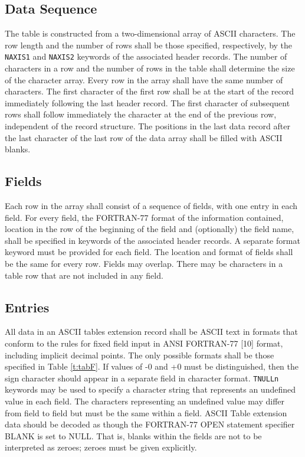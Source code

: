    \subsection{Data Sequence}
   The table is constructed from a two-dimensional array of 
   ASCII characters.
   The row length and the number of rows shall be those specified, 
   respectively, by the {\tt NAXIS1} 
   and {\tt NAXIS2} keywords
   of the associated header records.  The
   number of characters in a row and the number of rows in the
   table shall determine the size of the character array.  Every row
   in the array shall have the same number of characters.  The
   first character of the first row shall be at the start of the record
   immediately following the last header record.  The first
   character of subsequent rows shall follow immediately the
   character at the end of the previous row,
   independent of the record structure.  The positions in the last
   data record after the last character of the last row of the data
   array shall be filled with ASCII blanks.
  
   \subsection{Fields}
   Each row in the array shall consist of a sequence of fields,
   with one entry in each field.  For every field, the FORTRAN-77
   format of the
   information contained, location in the row of the beginning of the
   field and (optionally) the field name, shall
   be specified in keywords of the associated header records.  A
   separate format keyword must be provided for each field.  The
   location and format of fields shall be the same for every row.
   Fields may overlap.  There may be characters in a table
   row that are not included in any field.
  
   \subsection{Entries}
   All data in an ASCII tables extension record shall 
   be ASCII text in formats that conform to the 
   rules for fixed field input in ANSI 
   FORTRAN-77 [10] format, including
   implicit decimal points.
   The only possible formats shall be those specified 
   in Table \ref{t:tabF}.  If values of -0 and +0 must be 
   distinguished, then the sign character should 
   appear in a separate field in character format.  
   {\tt TNULLn} keywords may be used 
   to specify a character
   string that represents
   an undefined value in each field. The
   characters representing an undefined value may differ from field
   to field but must be the same within a field.  ASCII Table 
   extension data should be decoded as though 
   the FORTRAN-77 OPEN statement specifier 
   BLANK is set to NULL.  That is, blanks
   within the fields are not to be interpreted as zeroes;
   zeroes must be given explicitly.
  
